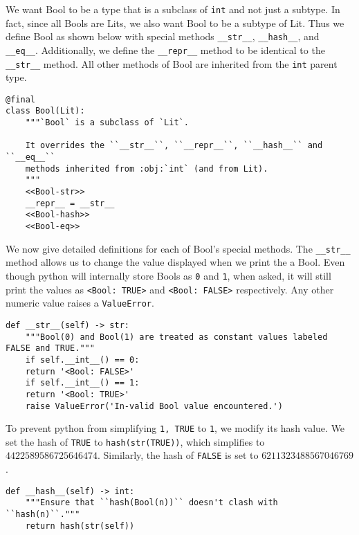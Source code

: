 \documentclass[11pt]{article}
\begin{document}
We want Bool to be a type that is a subclass of \texttt{int} and not just a
subtype. In fact, since all Bools are Lits, we also want Bool to be a
subtype of Lit. Thus we define Bool as shown below with special methods
\texttt{\_\_str\_\_}, \texttt{\_\_hash\_\_}, and \texttt{\_\_eq\_\_}. Additionally, we define the \texttt{\_\_repr\_\_}
method to be identical to the \texttt{\_\_str\_\_} method. All other methods of Bool
are inherited from the \texttt{int} parent type.

\begin{verbatim}
@final
class Bool(Lit):
    """`Bool` is a subclass of `Lit`.

    It overrides the ``__str__``, ``__repr__``, ``__hash__`` and ``__eq__``
    methods inherited from :obj:`int` (and from Lit).
    """
    <<Bool-str>>
    __repr__ = __str__
    <<Bool-hash>>
    <<Bool-eq>>
\end{verbatim}

We now give detailed definitions for each of Bool's special methods. The
\texttt{\_\_str\_\_} method allows us to change the value displayed when we print the a
Bool. Even though python will internally store Bools as \texttt{0} and \texttt{1}, when asked,
it will still print the values as \texttt{<Bool: TRUE>} and \texttt{<Bool: FALSE>}
respectively.  Any other numeric value raises a \texttt{ValueError}.

\begin{verbatim}
def __str__(self) -> str:
    """Bool(0) and Bool(1) are treated as constant values labeled FALSE and TRUE."""
    if self.__int__() == 0:
	return '<Bool: FALSE>'
    if self.__int__() == 1:
	return '<Bool: TRUE>'
    raise ValueError('In-valid Bool value encountered.')
\end{verbatim}

To prevent python from simplifying \texttt{{1, TRUE}} to \texttt{{1}}, we modify
its hash value. We set the hash of \texttt{TRUE} to \texttt{hash(str(TRUE))}, which
simplifies to \(4422589586725646474\). Similarly, the hash of \texttt{FALSE} is set to
\(6211323488567046769\).
\begin{verbatim}
def __hash__(self) -> int:
    """Ensure that ``hash(Bool(n))`` doesn't clash with ``hash(n)``."""
    return hash(str(self))
\end{verbatim}
\end{document}
